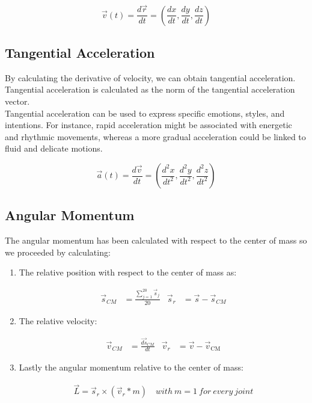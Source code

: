 \begin{equation}
  \vec{v}(t) = \frac{d\vec{r}}{dt} = \left(\frac{dx}{dt}, \frac{dy}{dt}, \frac{dz}{dt}\right)
\end{equation}

\subsection{Tangential Acceleration}
By calculating the derivative of velocity, we can obtain tangential acceleration.
Tangential acceleration is calculated as the norm of the tangential acceleration vector. \\
Tangential acceleration can be used to express specific emotions, styles, and intentions.
For instance, rapid acceleration might be associated with energetic and rhythmic movements, whereas a more gradual acceleration could be linked to fluid and delicate motions.

\begin{equation}
  \vec{a}(t) = \frac{d\vec{v}}{dt} = \left(\frac{d^2x}{dt^2}, \frac{d^2y}{dt^2}, \frac{d^2z}{dt^2}\right)
\end{equation}

\subsection{Angular Momentum}
The angular momentum has been calculated with respect to the center of mass so we proceeded by calculating:
\begin{enumerate}
  \item The relative position with respect to the center of mass as: 
  \begin{table}[h]
    \begin{align}
        \vec{s}_{CM} &= \frac{{\sum_{j=1}^{20} \vec{s}_{j}}}{{20}} &
        \vec{s}_{r} &= \vec{s} - \vec{s}_{CM} \label{eq:rel_pos}
    \end{align}
  \end{table}
  \item The relative velocity:
  \begin{table}[H]
    \begin{align}
        \vec{v}_{CM} &= \frac{\vec{ds}_{CM}}{dt} &
        \vec{v}_{r} &= \vec{v} - \vec{v}_{\text{CM}} \label{eq:rel_vel}
    \end{align}
  \end{table}
  \item Lastly the angular momentum relative to the center of mass:
  \begin{table}[H]
    \begin{align}
      \vec{L} = \vec{s}_{r} \times (\vec{v}_{r} * m) \quad with \ m = 1 \ for \ every \ joint \label{eq:ang_mom}
    \end{align}
  \end{table}
\end{enumerate}

